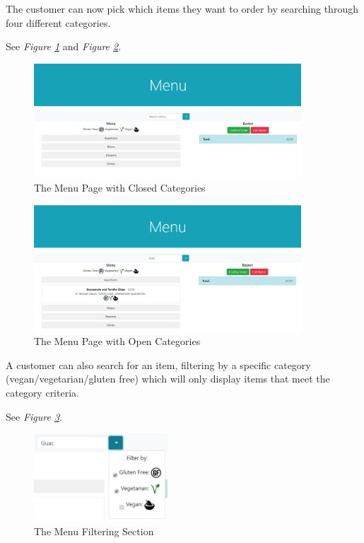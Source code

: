 \documentclass[12pt, twoside, a4paper]{report}
\begin{document}
The customer can now pick which items they want to order by searching through four different categories.

See \textit{Figure \ref{fig:menuClosed}} and \textit{Figure \ref{fig:menuOpen}}.

\begin{figure}[H]
  \centering
  \includegraphics[width=10cm]{MenuClosed.png}
  \caption{The Menu Page with Closed Categories}
  \label{fig:menuClosed}
\end{figure}

\begin{figure}[H]
  \centering
  \includegraphics[width=10cm]{MenuOpen.png}
  \caption{The Menu Page with Open Categories}
  \label{fig:menuOpen}
\end{figure}

A customer can also search for an item, filtering by a specific category (vegan/vegetarian/gluten free) which will only display items that meet the category criteria. 

See \textit{Figure \ref{fig:menuFilter}}.

\begin{figure}[H]
  \centering
  \includegraphics[width=5cm]{MenuFilter.png}
  \caption{The Menu Filtering Section}
  \label{fig:menuFilter}
\end{figure}
\end{document}
